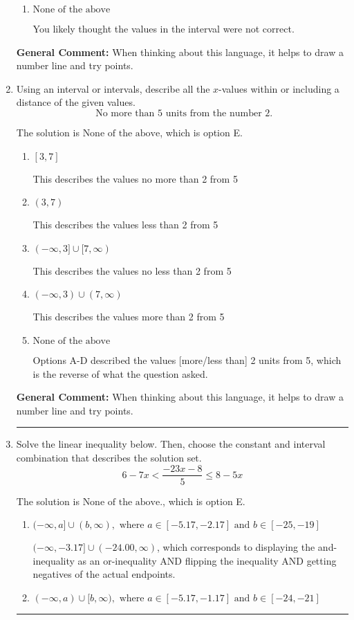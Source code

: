 \documentclass{extbook}[14pt]
\newcommand{\litem}[1]{\item #1

\rule{\textwidth}{0.4pt}}
\begin{document}
\begin{enumerate}
{\begin{enumerate}[label=\Alph*.]
This describes the values less than 5 from 10
\item \( \text{None of the above} \)

You likely thought the values in the interval were not correct.
\end{enumerate}

\textbf{General Comment:} When thinking about this language, it helps to draw a number line and try points.
}
\litem{
Using an interval or intervals, describe all the $x$-values within or including a distance of the given values.
\[ \text{ No more than } 5 \text{ units from the number } 2. \]

The solution is \( \text{None of the above} \), which is option E.\begin{enumerate}[label=\Alph*.]
\item \( [3, 7] \)

This describes the values no more than 2 from 5
\item \( (3, 7) \)

This describes the values less than 2 from 5
\item \( (-\infty, 3] \cup [7, \infty) \)

This describes the values no less than 2 from 5
\item \( (-\infty, 3) \cup (7, \infty) \)

This describes the values more than 2 from 5
\item \( \text{None of the above} \)

Options A-D described the values [more/less than] 2 units from 5, which is the reverse of what the question asked.
\end{enumerate}

\textbf{General Comment:} When thinking about this language, it helps to draw a number line and try points.
}
\litem{
Solve the linear inequality below. Then, choose the constant and interval combination that describes the solution set.
\[ 6 - 7 x < \frac{-23 x - 8}{5} \leq 8 - 5 x \]

The solution is \( \text{None of the above.} \), which is option E.\begin{enumerate}[label=\Alph*.]
\item \( (-\infty, a] \cup (b, \infty), \text{ where } a \in [-5.17, -2.17] \text{ and } b \in [-25, -19] \)

$(-\infty, -3.17] \cup (-24.00, \infty)$, which corresponds to displaying the and-inequality as an or-inequality AND flipping the inequality AND getting negatives of the actual endpoints.
\item \( (-\infty, a) \cup [b, \infty), \text{ where } a \in [-5.17, -1.17] \text{ and } b \in [-24, -21] \)


\end{enumerate}}
\end{enumerate}
\end{document}
